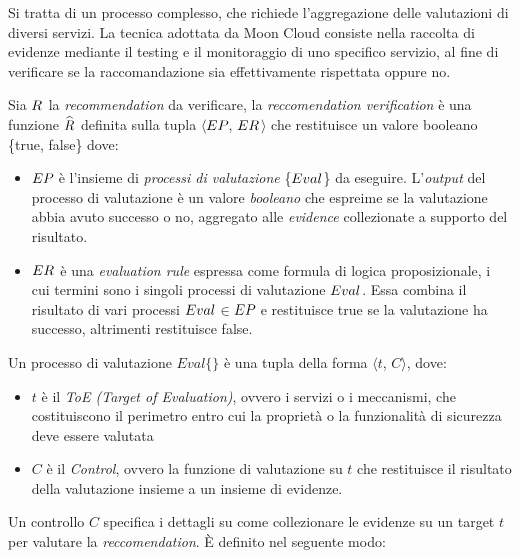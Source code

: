 \documentclass[../main.tex]{subfiles}
\begin{document}
Si tratta di un processo complesso, che richiede l'aggregazione delle valutazioni di diversi servizi. La tecnica adottata da Moon Cloud consiste nella raccolta di evidenze mediante il testing e il monitoraggio di uno specifico servizio, al fine di verificare se la raccomandazione sia effettivamente rispettata oppure no\cite{MyPaper}.

\begin{definition}\label{def:prop}
    Sia $R_{}\/$ la \textit{recommendation} da verificare, la \textit{reccomendation verification} è una funzione  $\widehat{R_{}\/}$  definita sulla tupla $\langle$$EP_{}\/$, $ER_{}\/$$\rangle$ che restituisce un valore booleano \{true, false\} dove:

\begin{itemize}
    \item $EP_{}\/$ è l'insieme di \textit{processi di valutazione} \{$Eval_{}\/$\} da eseguire. L'\textit{output} del processo di valutazione è un valore \textit{booleano} che espreime se la valutazione abbia avuto successo o no, aggregato alle \textit{evidence} collezionate a supporto del risultato.
        \item $ER_{}\/$ è una \textit{evaluation rule} espressa come formula di logica proposizionale, i cui termini sono i singoli processi di valutazione $Eval_{}\/$. Essa combina il risultato di vari processi $Eval_{}\/$$\in$$EP_{}\/$ e restituisce true se la valutazione ha successo, altrimenti restituisce false.
\end{itemize}
\end{definition}
\begin{definition}\label{def:eval}
    Un processo di valutazione\cite{MyPaper} $Eval\{\}$ è una tupla della forma $\langle$$t$, $C$$\rangle$, dove:
\begin{itemize}
	\item $t$ è il \emph{ToE (Target of Evaluation)}, ovvero i servizi o i meccanismi, che costituiscono il perimetro entro cui la proprietà o la funzionalità di sicurezza deve essere valutata
	\item $C$ è il \emph{Control}, ovvero la funzione di valutazione su $t$ che restituisce il risultato della valutazione insieme a un insieme di evidenze.
\end{itemize}
\end{definition}

Un controllo $C$ specifica i dettagli su come collezionare le evidenze su un target $t$ per valutare la \textit{reccomendation}. È definito nel seguente modo\cite{MyPaper}:
\end{document}

